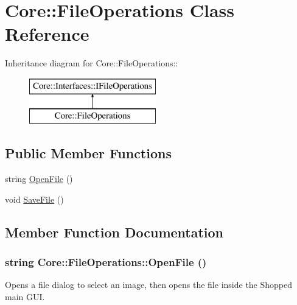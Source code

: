\hypertarget{class_core_1_1_file_operations}{
\section{Core::FileOperations Class Reference}
\label{class_core_1_1_file_operations}
}
Inheritance diagram for Core::FileOperations::\begin{figure}[H]
\begin{center}
\leavevmode
\includegraphics[height=2cm]{class_core_1_1_file_operations}
\end{center}
\end{figure}
\subsection*{Public Member Functions}
\begin{DoxyCompactItemize}
\item 
string \hyperlink{class_core_1_1_file_operations_a993401dfb5fb996bcd3188dab38d18d7}{OpenFile} ()
\item 
void \hyperlink{class_core_1_1_file_operations_a4cabf77d73d7c51a6a97f9f49af1dfb6}{SaveFile} ()
\end{DoxyCompactItemize}


\subsection{Member Function Documentation}
\hypertarget{class_core_1_1_file_operations_a993401dfb5fb996bcd3188dab38d18d7}{
\subsubsection[{OpenFile}]{\setlength{\rightskip}{0pt plus 5cm}string Core::FileOperations::OpenFile ()}}
\label{class_core_1_1_file_operations_a993401dfb5fb996bcd3188dab38d18d7}
Opens a file dialog to select an image, then opens the file inside the Shopped main GUI. 

